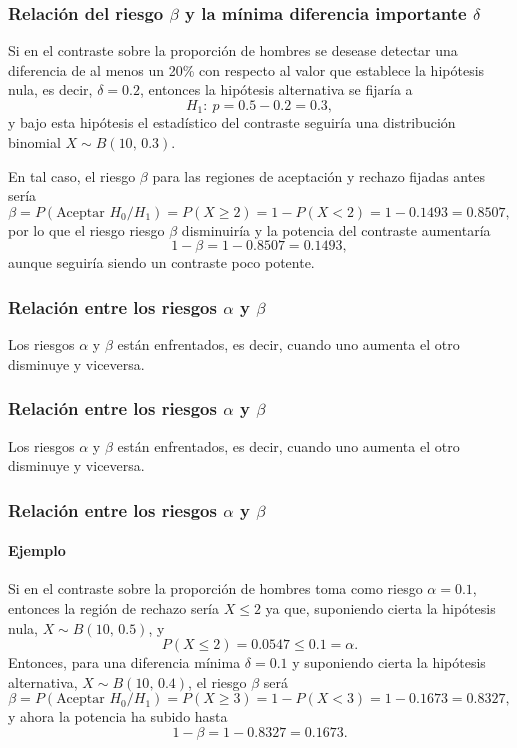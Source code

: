 \begin{frame}
\frametitle{Relación del riesgo $\beta$ y la mínima diferencia importante $\delta$}
Si en el contraste sobre la proporción de hombres se desease detectar una diferencia de al menos un 20\% con respecto
al valor que establece la hipótesis nula, es decir, $\delta=0.2$, entonces la hipótesis alternativa se fijaría a
\[
H_1:\ p=0.5-0.2=0.3,
\]
y bajo esta hipótesis el estadístico del contraste seguiría una distribución binomial $X\sim B(10,\,0.3)$.

En tal caso, el riesgo $\beta$ para las regiones de aceptación y rechazo fijadas antes sería
\[
\beta = P(\text{Aceptar }H_0/H_1) = P(X\geq 2) = 1 - P(X<2) = 1-0.1493 = 0.8507,
\]
por lo que el riesgo riesgo $\beta$ disminuiría y la potencia del contraste aumentaría
\[
1-\beta = 1-0.8507 = 0.1493,
\]
aunque seguiría siendo un contraste poco potente.
\end{frame}


\begin{frame}
\frametitle{Relación entre los riesgos $\alpha$ y $\beta$}
Los riesgos $\alpha$ y $\beta$ están enfrentados, es decir, cuando uno aumenta el otro disminuye y viceversa.
\begin{center}
\scalebox{0.7}{}
\end{center}
\end{frame}


\begin{frame}
\frametitle{Relación entre los riesgos $\alpha$ y $\beta$}
Los riesgos $\alpha$ y $\beta$ están enfrentados, es decir, cuando uno aumenta el otro disminuye y viceversa.
\begin{center}
\scalebox{0.7}{}
\end{center}
\end{frame}


\begin{frame}
\frametitle{Relación entre los riesgos $\alpha$ y $\beta$}
\framesubtitle{Ejemplo}
Si en el contraste sobre la proporción de hombres toma como riesgo $\alpha=0.1$, entonces la región de
rechazo sería $X\leq 2$ ya que, suponiendo cierta la hipótesis nula, $X\sim B(10,\, 0.5)$, y 
\[
P(X\leq 2) = 0.0547 \leq 0.1=\alpha.
\]
Entonces, para una diferencia mínima $\delta=0.1$ y suponiendo cierta la hipótesis alternativa, $X\sim B(10,\,0.4)$, el
riesgo $\beta$ será
\[
\beta = P(\text{Aceptar }H_0/H_1) = P(X\geq 3) = 1- P(X<3) = 1-0.1673 = 0.8327,
\]
y ahora la potencia ha subido hasta 
\[
1-\beta = 1-0.8327 = 0.1673.
\]
\end{frame}


